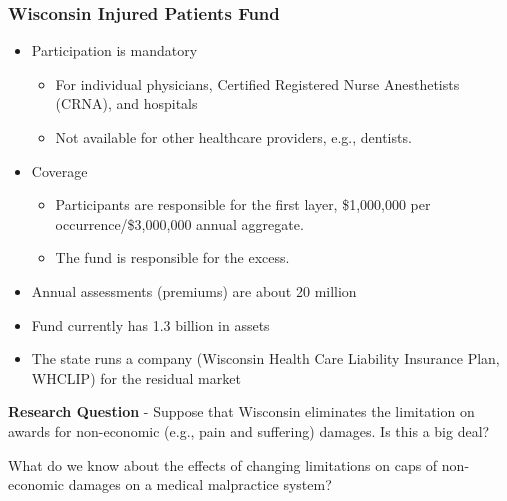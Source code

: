 \documentclass[serif,10pt]{beamer}
\begin{document}
\begin{frame}
\frametitle{Wisconsin Injured Patients Fund}
  \begin{itemize}
\item Participation is mandatory
\begin{itemize}
\item For individual physicians, Certified Registered Nurse Anesthetists (CRNA), and hospitals
\item Not available for other healthcare providers, e.g., dentists.
\end{itemize}
\item Coverage
\begin{itemize}
\item Participants are responsible for the first layer, \$1,000,000 per occurrence/\$3,000,000 annual aggregate.
\item The fund is responsible for the excess.\end{itemize}
\item Annual assessments (premiums) are about 20 million
\item Fund currently has 1.3 billion in assets
\item The state runs a company (Wisconsin Health Care Liability Insurance Plan, WHCLIP) for the residual market
\end{itemize}%
\pause


\textbf{Research Question} - Suppose that Wisconsin eliminates the limitation on awards for non-economic (e.g., pain and suffering) damages. Is this a big deal?

\bigskip

What do we know about the effects of changing limitations on caps of non-economic damages on a medical malpractice system?

\end{frame}
\end{document}
